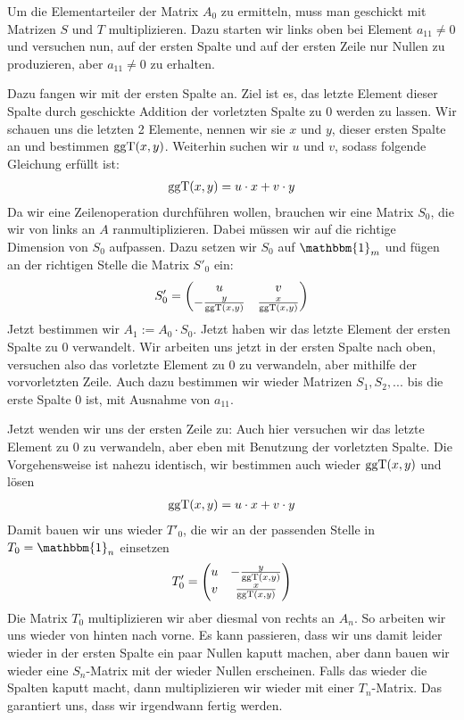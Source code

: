 \begin{*anmerkung}[Teil 1]
	Um die Elementarteiler der Matrix $A_0$ zu ermitteln, muss man geschickt mit Matrizen $S$ und $T$ multiplizieren. Dazu starten wir links oben bei Element $a_{11}\neq 0$ und versuchen nun, auf der ersten Spalte und auf der ersten Zeile nur Nullen zu produzieren, aber $a_{11}\neq 0$ zu erhalten.
	
	 Dazu fangen wir mit der ersten Spalte an. Ziel ist es, das letzte Element dieser Spalte durch geschickte Addition der vorletzten Spalte zu 0 werden zu lassen. Wir schauen uns die letzten 2 Elemente, nennen wir sie $x$ und $y$, dieser ersten Spalte an und bestimmen $\operatorname{ggT}(x,y)$. Weiterhin suchen wir $u$ und  $v$, sodass folgende Gleichung erfüllt ist:
	\begin{align}
		\operatorname{ggT}(x,y)=u\cdot x + v\cdot y\notag
	\end{align}
	Da wir eine Zeilenoperation durchführen wollen, brauchen wir eine Matrix $S_0$, die wir von links an $A$ ranmultiplizieren. Dabei müssen wir auf die richtige Dimension von $S_0$ aufpassen. Dazu setzen wir $S_0$ auf $\mathbbm{1}_m$ und fügen an der richtigen Stelle die Matrix $S'_0$ ein:
	\begin{align}
		S'_0=\begin{pmatrix}u & v \\ -\frac{y}{\operatorname{ggT}(x,y)} & \frac{x}{\operatorname{ggT}(x,y)}\end{pmatrix}\notag
	\end{align}
	Jetzt bestimmen wir $A_1:=A_0\cdot S_0$. Jetzt haben wir das letzte Element der ersten Spalte zu 0 verwandelt. Wir arbeiten uns jetzt in der ersten Spalte nach oben, versuchen also das vorletzte Element zu 0 zu verwandeln, aber mithilfe der vorvorletzten Zeile. Auch dazu bestimmen wir wieder Matrizen $S_1,S_2,...$ bis die erste Spalte 0 ist, mit Ausnahme von $a_{11}$. 
\end{*anmerkung}
\begin{*anmerkung}[Teil 2]
	Jetzt wenden wir uns der ersten Zeile zu: Auch hier versuchen wir das letzte Element zu 0 zu verwandeln, aber eben mit Benutzung der vorletzten Spalte. Die Vorgehensweise ist nahezu identisch, wir bestimmen auch wieder $\operatorname{ggT}(x,y)$ und lösen
	\begin{align}
		\operatorname{ggT}(x,y)=u\cdot x + v\cdot y\notag
	\end{align}
	Damit bauen wir uns wieder $T'_0$, die wir an der passenden Stelle in $T_0=\mathbbm{1}_n$ einsetzen
	\begin{align}
		T'_0=\begin{pmatrix}u & -\frac{y}{\operatorname{ggT}(x,y)} \\ v & \frac{x}{\operatorname{ggT}(x,y)}\end{pmatrix}\notag
	\end{align}
	Die Matrix $T_0$ multiplizieren wir aber diesmal von rechts an $A_n$. So arbeiten wir uns wieder von hinten nach vorne. Es kann passieren, dass wir uns damit leider wieder in der ersten Spalte ein paar Nullen kaputt machen, aber dann bauen wir wieder eine $S_n$-Matrix mit der wieder Nullen erscheinen. Falls das wieder die Spalten kaputt macht, dann multiplizieren wir wieder mit einer $T_n$-Matrix. Das  garantiert uns, dass wir irgendwann fertig werden.
\end{*anmerkung}

